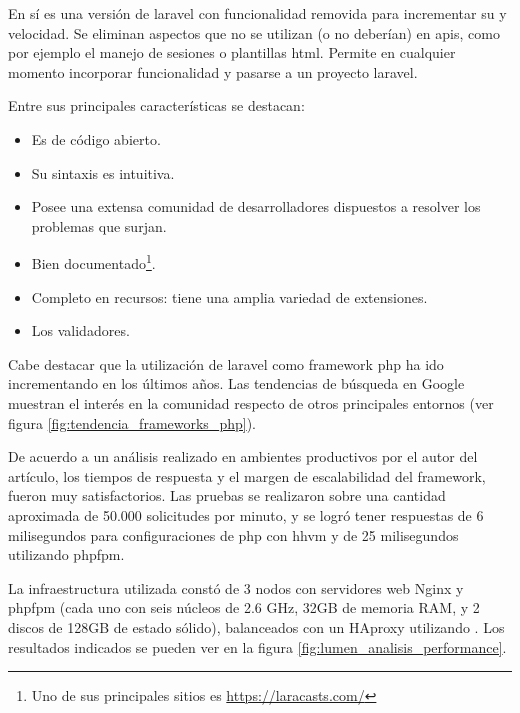 En sí es una versión de \gls{laravel} con funcionalidad removida para incrementar su  y velocidad. Se eliminan aspectos que no se utilizan (o no deberían) en \glspl{api}, como por ejemplo el manejo de sesiones o plantillas \gls{html}. Permite en cualquier momento incorporar funcionalidad y pasarse a un proyecto \gls{laravel}.

Entre sus principales características se destacan:
\begin{itemize}
\item Es de código abierto.
\item Su sintaxis es intuitiva.
\item Posee una extensa comunidad de desarrolladores dispuestos a resolver los problemas que surjan.
\item Bien documentado\footnote{Uno de sus principales sitios es \url{https://laracasts.com/}}.
\item Completo en recursos: tiene una amplia variedad de extensiones.
\item Los validadores.
\end{itemize}

Cabe destacar que la utilización de \gls{laravel} como \gls{framework} \gls{php} ha ido incrementando en los últimos años. Las tendencias de búsqueda en Google muestran el interés en la comunidad\cite{google2017tendenciaFramework} respecto de otros principales entornos (ver figura \ref{fig:tendencia_frameworks_php}).


De acuerdo a un análisis realizado en ambientes productivos por el autor del artículo\cite{biler2015performance}, los tiempos de respuesta y el margen de escalabilidad del \gls{framework}, fueron muy satisfactorios. Las pruebas se realizaron sobre una cantidad aproximada de 50.000 solicitudes por minuto, y se logró tener respuestas de 6 milisegundos para configuraciones de \gls{php} con \gls{hhvm} y de 25 milisegundos utilizando \gls{phpfpm}.

La infraestructura utilizada constó de 3 nodos con servidores web Nginx y \gls{phpfpm} (cada uno con seis núcleos de 2.6 GHz, 32GB de memoria RAM, y 2 discos de 128GB de estado sólido), balanceados con un HAproxy utilizando . Los resultados indicados se pueden ver en la figura \ref{fig:lumen_analisis_performance}.

